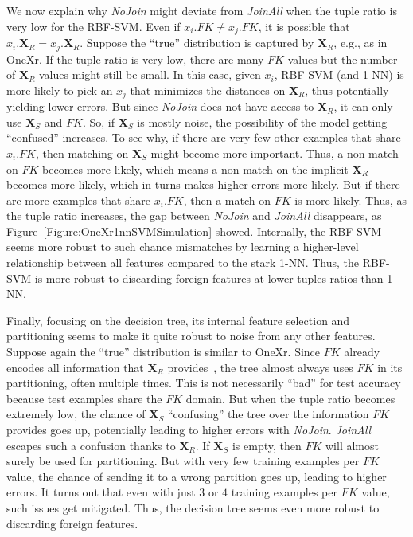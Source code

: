 \documentclass{vldb}
\begin{document}
We now explain why \textit{NoJoin} might deviate from \textit{JoinAll} when the tuple ratio is very low for the RBF-SVM. Even if $x_i.FK \ne x_j.FK$, it is possible that 
$x_i.\textbf{X}_R = x_j.\textbf{X}_R$. Suppose the ``true'' distribution is captured by $\textbf{X}_R$, e.g., as in OneXr. 
If the tuple ratio is very low, there are many $FK$ values but the number of $\textbf{X}_R$ values might still be small. In this case, given $x_i$, RBF-SVM (and 1-NN) is more 
likely to pick an $x_j$ that minimizes the distances on $\textbf{X}_R$, thus potentially yielding lower errors. But since \textit{NoJoin} does not have access to 
$\textbf{X}_R$, it can only use $\textbf{X}_S$ and $FK$. So, if $\textbf{X}_S$ is mostly noise, the possibility of the model getting ``confused'' 
increases. To see why, if there are very few other examples that share $x_i.FK$, then matching on $\textbf{X}_S$ might become more important. 
Thus, a non-match on $FK$ becomes more likely, which means a non-match on the implicit $\textbf{X}_R$ becomes more likely, which in turns makes higher errors more likely. 
But if there are more examples that share $x_i.FK$, then a match on $FK$ is more likely. Thus, as the tuple ratio increases, the gap between \textit{NoJoin} 
and \textit{JoinAll} disappears, as Figure~\ref{Figure:OneXr1nnSVMSimulation} showed. Internally, the RBF-SVM seems more robust to such chance mismatches by learning a higher-level 
relationship between all features compared to the stark 1-NN. Thus, the RBF-SVM is more robust to discarding foreign features at lower tuples ratios than 1-NN.

Finally, focusing on the decision tree, its internal feature selection and partitioning seems to make it quite robust to noise from any other features. Suppose again the ``true'' 
distribution is similar to OneXr. Since $FK$ already encodes all information that $\textbf{X}_R$ provides~\cite{hamlet}, the tree almost always uses $FK$ in its partitioning, 
often multiple times. This is not necessarily ``bad'' for test accuracy because test examples share the $FK$ domain. 
But when the tuple ratio becomes extremely low, the chance of $\textbf{X}_S$ ``confusing'' the tree over the information $FK$ provides goes up, potentially 
leading to higher errors with \textit{NoJoin}. \textit{JoinAll} escapes such a confusion thanks to $\textbf{X}_R$. If $\textbf{X}_S$ is empty, then $FK$ will almost surely
be used for partitioning. But with very few training examples per $FK$ value, the chance of sending it to a wrong partition goes up, leading to higher errors. It turns out 
that even with just $3$ or $4$ training examples per $FK$ value, such issues get mitigated. Thus, the decision tree seems even more robust to discarding foreign features.
\end{document}
